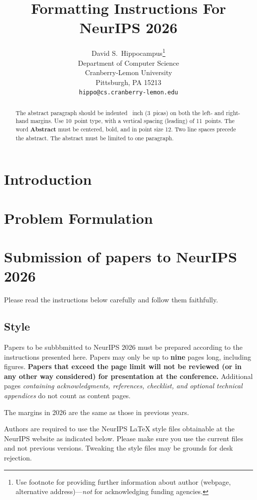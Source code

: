 \documentclass{article}
\title{Formatting Instructions For NeurIPS 2026}
\author{%
  David S.~Hippocampus\thanks{Use footnote for providing further information
    about author (webpage, alternative address)---\emph{not} for acknowledging
    funding agencies.} \\
  Department of Computer Science\\
  Cranberry-Lemon University\\
  Pittsburgh, PA 15213 \\
  \texttt{hippo@cs.cranberry-lemon.edu} \\
}
\begin{document}
\maketitle


\begin{abstract}
  The abstract paragraph should be indented ~inch (3~picas) on both the left- and right-hand margins. Use 10~point type, with a vertical spacing (leading) of 11~points. The word \textbf{Abstract} must be centered, bold, and in point size 12. Two line spaces precede the abstract. The abstract must be limited to one paragraph.
\end{abstract}


\section{Introduction}
\section{Problem Formulation}



\section{Submission of papers to NeurIPS 2026}


Please read the instructions below carefully and follow them faithfully.


\subsection{Style}


Papers to be subbbmitted to NeurIPS 2026 must be prepared according to the
instructions presented here. Papers may only be up to {\bf nine} pages long, including figures. \textbf{Papers that exceed the page limit will not be reviewed (or in any other way considered) for presentation at the conference.}
Additional pages \emph{containing acknowledgments, references, checklist, and optional technical appendices} do not count as content pages. 


The margins in 2026 are the same as those in previous years.


Authors are required to use the NeurIPS \LaTeX{} style files obtainable at the NeurIPS website as indicated below. Please make sure you use the current files and not previous versions. Tweaking the style files may be grounds for desk rejection.
\end{document}
